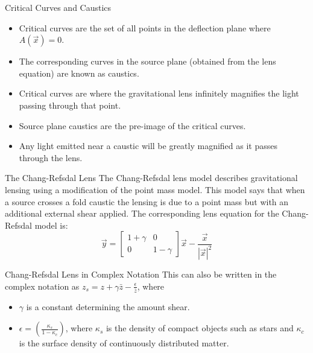 \documentclass[aspectratio=1610,xcolor=dvipsnames,t]{beamer}
\begin{document}
\begin{frame}{Critical Curves and Caustics}
\begin{itemize} 
    \item Critical curves are the set of all points in the deflection plane where $A(\vec{x}) = 0$. 
    \item The corresponding curves in the source plane (obtained from the lens equation) are known as caustics.    \item Critical curves are where the gravitational lens infinitely magnifies the light passing through
          that point. 
    \item Source plane caustics are the pre-image of the critical curves.
    \item Any light emitted near a caustic will be greatly magnified as it passes through the lens. 
\end{itemize}
\end{frame} 

\begin{frame}{The Chang-Refsdal Lens}
The Chang-Refsdal lens model describes gravitational lensing using a modification
of the point mass model. This model says that when a source crosses a fold caustic
the lensing is due to a point mass but with an additional external shear applied.
The corresponding lens equation for the Chang-Refsdal model is:
\begin{equation}
    \vec{y} = \left[
                \begin{array}{cc}
                    1 + \gamma & 0   \\
                    0          & 1 - \gamma
                \end{array} 
              \right] \vec{x} - \frac{\vec{x}}{|\vec{x}|^2}
\end{equation}
\end{frame} 

\begin{frame}{Chang-Refsdal Lens in Complex Notation}  
This can also be written in the complex notation as 
$z_s = z + \gamma \bar{z} - \frac{\epsilon}{\bar{z}}$, where
\begin{itemize}
    \item $\gamma$ is a constant determining the amount shear.
    \item $\epsilon = (\frac{\kappa_s}{1 - \kappa_c})$, where $\kappa_s$ is
          the density of compact objects such as stars and $\kappa_c$ is the
          surface density of continuously distributed matter.
\end{itemize}
\end{frame} 
\end{document}
